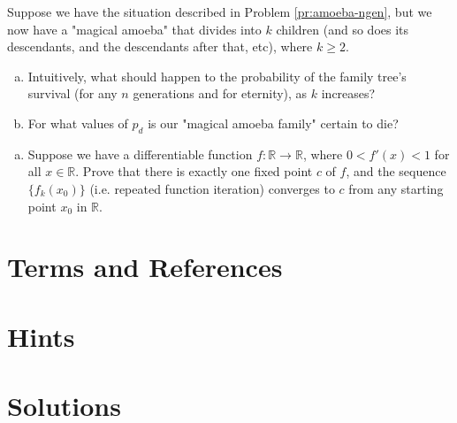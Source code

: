 
\begin{problem}
\label{pr:amoeba-kdesc}
Suppose we have the situation described in Problem \ref{pr:amoeba-ngen}, but we now have a "magical amoeba" that divides into $k$ children (and so does its descendants, and the descendants after that, etc), where $k \geq 2$. 

\begin{enumerate}[(a)]
\item Intuitively, what should happen to the probability of the family tree's survival (for any $n$ generations and for eternity), as $k$ increases?
\item For what values of $p_d$ is our "magical amoeba family" certain to die?
\end{enumerate}
\end{problem}

\begin{problem}
\qquad
\begin{enumerate}[(a)]
\item Suppose we have a differentiable function $f: \mathbb{R} \rightarrow \mathbb{R}$, where $0 < f'(x) < 1$ for all $x \in \mathbb{R}$. Prove that there is exactly one fixed point $c$ of $f$, and the sequence $\{f_k(x_0)\}$ (i.e. repeated function iteration) converges to $c$ from any starting point $x_0$ in $\mathbb{R}$. 

\end{enumerate}
\end{problem}


\newpage
\section{Terms and References}

\section{Hints}

\newpage
\section{Solutions}

